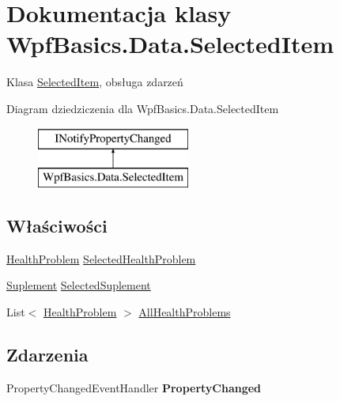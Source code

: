 \hypertarget{class_wpf_basics_1_1_data_1_1_selected_item}{}\section{Dokumentacja klasy Wpf\+Basics.\+Data.\+Selected\+Item}
\label{class_wpf_basics_1_1_data_1_1_selected_item}


Klasa \hyperlink{class_wpf_basics_1_1_data_1_1_selected_item}{Selected\+Item}, obsługa zdarzeń  


Diagram dziedziczenia dla Wpf\+Basics.\+Data.\+Selected\+Item\begin{figure}[H]
\begin{center}
\leavevmode
\includegraphics[height=2.000000cm]{class_wpf_basics_1_1_data_1_1_selected_item}
\end{center}
\end{figure}
\subsection*{Właściwości}
\begin{DoxyCompactItemize}
\item 
\hyperlink{class_wpf_basics_1_1_data_1_1_health_problem}{Health\+Problem} \hyperlink{class_wpf_basics_1_1_data_1_1_selected_item_a8d407f9cb4b499f83cb925087262d76a}{Selected\+Health\+Problem}
\item 
\hyperlink{class_wpf_basics_1_1_data_1_1_suplement}{Suplement} \hyperlink{class_wpf_basics_1_1_data_1_1_selected_item_ab38632718367f7402e49c68bf020913d}{Selected\+Suplement}
\item 
List$<$ \hyperlink{class_wpf_basics_1_1_data_1_1_health_problem}{Health\+Problem} $>$ \hyperlink{class_wpf_basics_1_1_data_1_1_selected_item_ad36fd63380243a4f18f461fecf26ba16}{All\+Health\+Problems}
\end{DoxyCompactItemize}
\subsection*{Zdarzenia}
\begin{DoxyCompactItemize}
\item 
\mbox{\label{class_wpf_basics_1_1_data_1_1_selected_item_a9acae308d6d33dacb6a7316658f3e0c6}} 
Property\+Changed\+Event\+Handler {\bfseries Property\+Changed}
\end{DoxyCompactItemize}


